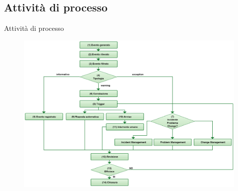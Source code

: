 \subsection*{Attività di processo}
\begin{frame}{Attività di processo}
\begin{figure}
\includegraphics[scale=0.16]{Images/Event_management.png}
\end{figure}
\end{frame}